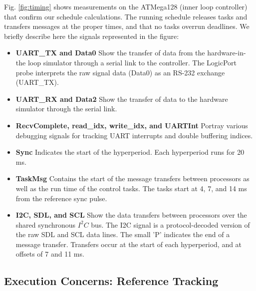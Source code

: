 Fig. \ref{fig:timing} shows measurements on the ATMega128 (inner loop controller) 
that confirm our schedule calculations.  The running schedule releases tasks and 
transfers messages at the proper times, and that no tasks overrun deadlines.  We 
briefly describe here the signals represented in the figure:

\begin{itemize}
 \item {\bf UART\_TX and Data0} Show the transfer of data from the 
hardware-in-the loop simulator through a serial link to the controller.  The LogicPort
probe interprets the raw signal data (Data0) as an RS-232 exchange (UART\_TX).
 \item {\bf UART\_RX and Data2} Show the transfer of data to the hardware simulator
through the serial link.
 \item {\bf RecvComplete, read\_idx, write\_idx, and UARTInt} Portray various debugging
signals for tracking UART interrupts and double buffering indices.
 \item {\bf Sync} Indicates the start of the hyperperiod.  Each hyperperiod runs for 
20 ms.
 \item {\bf TaskMsg} Contains the start of the message transfers between processors
 as well as the run time of the control tasks.  The tasks start at 4, 7, and 14 ms
from the reference sync pulse.
 \item {\bf I2C, SDL, and SCL} Show the data transfers between processors over
the shared synchronous $I^2C$ bus.  The I2C signal is a protocol-decoded version of the 
raw SDL and SCL data lines.  The small 'P' indicates the end of a message transfer.
Transfers occur at the start of each hyperperiod, and at offsets of 7 and 11 ms.
\end{itemize}

\subsection{Execution Concerns: Reference Tracking}

